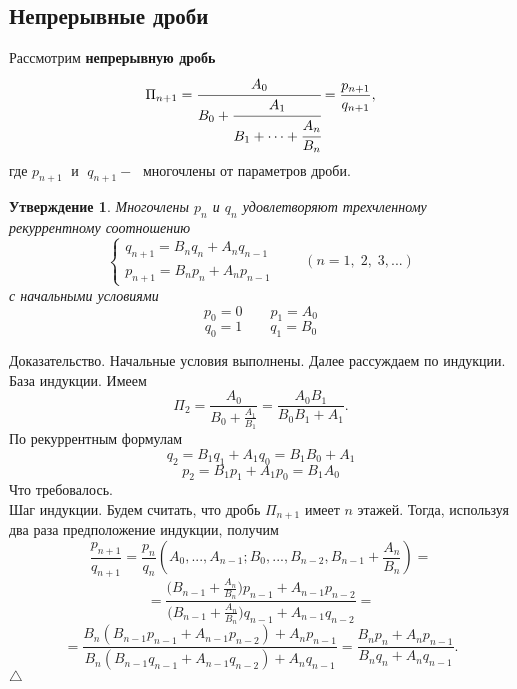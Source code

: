 \documentclass[12pt,a4paper]{article}
\theoremstyle{plain}   \newtheorem{Pro}{Задача}
\newtheorem{Sta}{Утверждение}
\begin{document}
\subsection{Непрерывные дроби}
Рассмотрим
{\bfseries непрерывную дробь}
\begin{equation*}
  \Pi _{n+1} =
    \cfrac{A_0 }{B_0 +
	 \cfrac{A_1 }{B_1 + \dotsb +
	  \cfrac{A_n }{B_n
	   }}}
   = \frac{ p_{n+1}}{q_{n+1}},
\end{equation*}
где
$ p_{n+1} \; $
и
$ \; q_{n+1} - \; $
многочлены от параметров дроби.
\begin{Sta}
Многочлены
$ p_n $
и
$ q_n $
удовлетворяют трехчленному рекуррентному соотношению
\begin{equation*}
  \begin{cases}
    q_{n+1}=B_n q_n + A_n q_{n-1}\\
	p_{n+1}=B_n p_n + A_n p_{n-1}
  \end{cases}
  \qquad ( n=1, \; 2, \; 3,...)
\end{equation*}
с начальными условиями
$$
  p_0 =0 \quad \quad p_1 =A_0
$$
$$
  q_0 =1 \quad \quad q_1 =B_0
$$
\end{Sta}
{\Large Доказательство.}
Начальные условия выполнены. Далее рассуждаем по индукции.\\
База индукции. Имеем
$$
  \Pi _2 = \frac{A_0}{B_0 +\frac{A_1}{B_1}}=
  \frac{A_0 B_1 }{B_0 B_1 + A_1 }.
$$
По рекуррентным формулам
$$
  q_2 =B_1 q_1 +A_1 q_0 =B_1 B_0 +A_1
$$
$$
  p_2 =B_1 p_1 +A_1 p_0 =B_1 A_0
$$
Что требовалось.
\\
Шаг индукции. Будем считать, что дробь
$ \Pi _{n+1} $
имеет
$ n $
этажей. Тогда, используя два раза предположение индукции, получим
$$
  \frac{p_{n+1}}{q_{n+1}}=
  \frac{p_n}{q_n}(A_0 ,...,A_{n-1}; B_0 ,..., B_{n-2},
  B_{n-1}+ \frac{A_n}{B_n})=
$$
$$
  =\frac{\bigl ( B_{n-1} + \frac{A_n}{B_n} \bigr )
  p_{n-1} + A_{n-1} p_{n-2} }
  {\bigl ( B_{n-1} + \frac{A_n}{B_n} \bigr )
  q_{n-1} + A_{n-1} q_{n-2} } =
$$
$$
  = \frac{B_n ( B_{n-1} p_{n-1}  + A_{n-1} p_{n-2} )
  +A_n p_{n-1} }
  {B_n ( B_{n-1} q_{n-1} + A_{n-1} q_{n-2} )
  +A_n q_{n-1} }=
  \frac{B_n p_n + A_n p_{n-1} }
  {B_n q_n + A_n q_{n-1} }.
$$
$ \triangle $
\\
\end{document}
